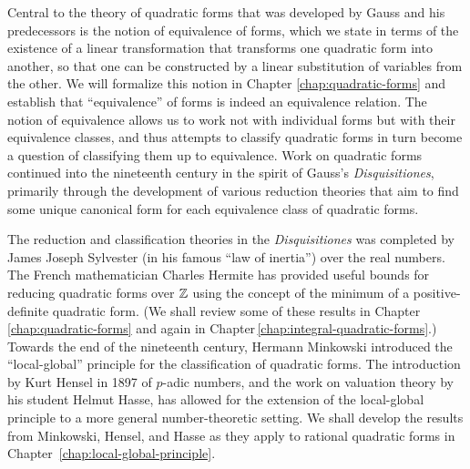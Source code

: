 Central to the theory of quadratic forms that was developed by Gauss and his predecessors is the notion of equivalence of forms, which we state in terms of the existence of a linear transformation that transforms one quadratic form into another, so that one can be constructed by a linear substitution of variables from the other. We will formalize this notion in Chapter \ref{chap:quadratic-forms} and establish that ``equivalence'' of forms is indeed an equivalence relation. The notion of equivalence allows us to work not with individual forms but with their equivalence classes, and thus attempts to classify quadratic forms in turn become a question of classifying them up to equivalence. Work on quadratic forms continued into the nineteenth century in the spirit of Gauss's \emph{Disquisitiones}, primarily through the development of various reduction theories that aim to find some unique canonical form for each equivalence class of quadratic forms.

The reduction and classification theories in the \emph{Disquisitiones} was completed by James Joseph Sylvester (in his famous ``law of inertia'') over the real numbers. The French mathematician Charles Hermite has provided useful bounds for reducing quadratic forms over \(\mathbb{Z}\) using the concept of the minimum of a positive-definite quadratic form. \cite{gerstein2008basic} (We shall review some of these results in Chapter \ref{chap:quadratic-forms} and again in Chapter\,\ref{chap:integral-quadratic-forms}.) Towards the end of the nineteenth century, Hermann Minkowski introduced the ``local-global'' principle for the classification of quadratic forms. The introduction by Kurt Hensel in 1897 of \(p\)-adic numbers, and the work on valuation theory by his student Helmut Hasse, has allowed for the extension of the local-global principle to a more general number-theoretic setting. \cite{gerstein2008basic,hensel1913zahlentheorie,hasse1922uber} We shall develop the results from Minkowski, Hensel, and Hasse as they apply to rational quadratic forms in Chapter \,\ref{chap:local-global-principle}.

